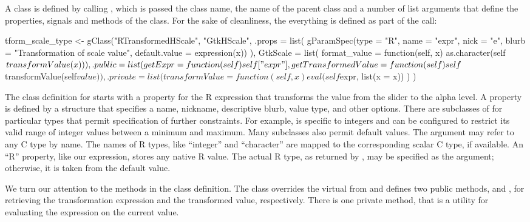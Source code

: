A class is defined by calling , which is passed the
class name, the name of the parent class and a number of list
arguments that define the properties, signals and methods of the
class. For the sake of cleanliness, the everything is defined as part
of the  call:
\begin{Schunk}
\begin{Sinput}
 tform_scale_type <- 
   gClass("RTransformedHScale", "GtkHScale",
          .props = list(
            gParamSpec(type = "R", name = "expr", nick = "e", 
                       blurb = "Transformation of scale value",                 
                       default.value = expression(x))
            ),
          GtkScale = list(
            format_value = function(self, x) 
              as.character(self$transformValue(x))
            ),
          .public = list(
            getExpr = function(self) self["expr"],
            getTransformedValue = function(self) 
              self$transformValue(self$value)
            ),
          .private = list(
            transformValue = function(self, x) 
              eval(self$expr, list(x = x))
           )
          )
\end{Sinput}
\end{Schunk}

The class definition for  starts with a
property for the R expression that transforms the value from the
slider to the alpha level. A property is defined by a
 structure that specifies a name, nickname,
descriptive blurb, value type, and other options.  There are
subclasses of  for particular types that permit
specification of further constraints. For example,
 is specific to integers and can be configured to
restrict its valid range of integer values between a minimum and
maximum. Many  subclasses also permit default
values. The  argument may refer to any C
type by name. The names of R types, like ``integer'' and ``character''
are mapped to the corresponding scalar C type, if available. An ``R''
property, like our expression, stores any native R value. The actual R
type, as returned by , may be specified as the
 argument; otherwise, it is taken from
the default value.

We turn our attention to the methods in the class definition. The
class overrides the  virtual from
 and defines two public methods,  and
, for retrieving the transformation
expression and the transformed value, respectively. There is one
private method,  that is a utility for evaluating
the expression on the current value.

